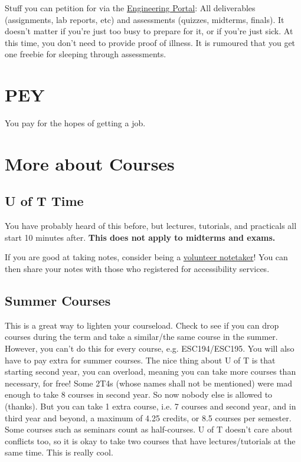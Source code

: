 Stuff you can petition for via the \href{https://www.google.com/url?sa=t&rct=j&q=&esrc=s&source=web&cd=&cad=rja&uact=8&ved=2ahUKEwjZj-qeh-7-AhX-kokEHX8-C8YQFnoECA0QAQ&url=http\%3A\%2F\%2Fundergrad.engineering.utoronto.ca\%2Fskule-\%2520\%2520\%2520\%2520\%2520\%2520\%2520\%2520\%2520\%2520\%2520\%2520life\%2Fthe-engineering-portal\%2F&usg=AOvVaw145xL8tAHUKBRq6D6rbDhS}{Engineering Portal}: All deliverables (assignments, lab reports, etc) and assessments (quizzes, midterms, finals). It doesn't matter if you're just too busy to prepare for it, or if you're just sick. At this time, you don't need to provide proof of illness. It is rumoured that you get one freebie for sleeping through assessments.

\section{PEY}

You pay for the hopes of getting a job.

\section{More about Courses}

\subsection{U of T Time}

You have probably heard of this before, but lectures, tutorials, and practicals all start 10 minutes after. \textbf{This does not apply to midterms and exams.}


If you are good at taking notes, consider being a \href{https://studentlife.utoronto.ca/program/volunteer-note-taking/}{volunteer notetaker}! You can then share your notes with those who registered for accessibility services.

\subsection{Summer Courses}

This is a great way to lighten your courseload. Check to see if you can drop courses during the term and take a similar/the same course in the summer. However, you can't do this for every course, e.g. ESC194/ESC195. You will also have to pay extra for summer courses. The nice thing about U of T is that starting second year, you can overload, meaning you can take more courses than necessary, for free! Some 2T4s (whose names shall not be mentioned) were mad enough to take 8 courses in second year. So now nobody else is allowed to (thanks). But you can take 1 extra course, i.e. 7 courses and second year, and in third year and beyond, a maximum of 4.25 credits, or 8.5 courses per semester. Some courses such as seminars count as half-courses. U of T doesn't care about conflicts too, so it is okay to take two courses that have lectures/tutorials at the same time. This is really cool.

